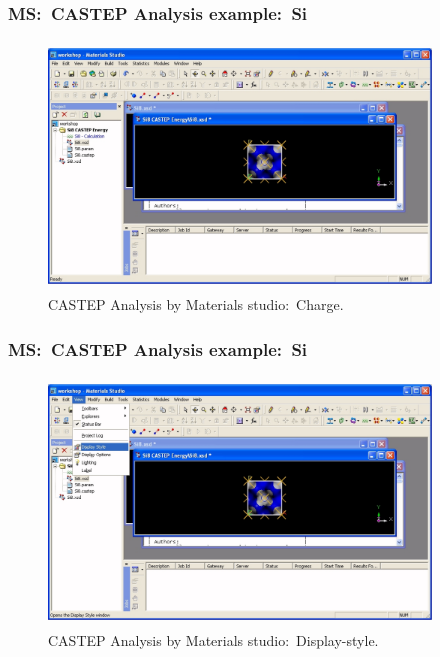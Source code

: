 \frame
{
	\frametitle{\textrm{MS:~CASTEP Analysis example:~Si}}
\begin{figure}[h!]
\centering
\vspace*{-0.10in}
\includegraphics[height=2.60in,width=4.00in,viewport=0 0 1210 742,clip]{Figures/MS-CASTEP-11-Si-Analysis-charge.png}
\caption{\tiny \textrm{CASTEP Analysis by Materials studio:~Charge.}}%
\label{MS-CASTEP-Analysis-Charge}
\end{figure}
}

\frame
{
	\frametitle{\textrm{MS:~CASTEP Analysis example:~Si}}
\begin{figure}[h!]
\centering
\vspace*{-0.10in}
\includegraphics[height=2.60in,width=4.00in,viewport=0 0 1210 742,clip]{Figures/MS-CASTEP-11-Si-Analysis-display.png}
\caption{\tiny \textrm{CASTEP Analysis by Materials studio:~Display-style.}}%
\label{MS-CASTEP-Analysis-display}
\end{figure}
}

